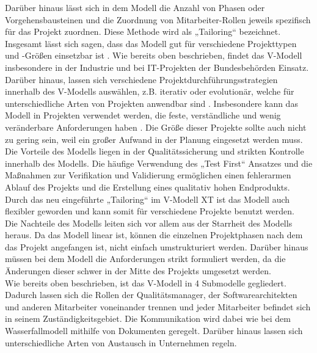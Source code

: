 Darüber hinaus lässt sich in dem Modell die Anzahl von Phasen oder Vorgehensbausteinen und die Zuordnung von Mitarbeiter-Rollen jeweils spezifisch für das Projekt zuordnen. Diese Methode wird als „Tailoring“ 
bezeichnet. \cite[6]{Frie:2009:V:}
\\
Insgesamt lässt sich sagen, dass das Modell gut für verschiedene Projekttypen und -Größen einsetzbar ist \cite[3]{Frie:2009:V:}. 
Wie bereits oben beschrieben, findet das V-Modell insbesondere in der Industrie und bei IT-Projekten der Bundesbehörden Einsatz. 
Darüber hinaus, lassen sich verschiedene Projektdurchführungsstrategien innerhalb des V-Modells auswählen, z.B. iterativ oder evolutionär, welche für unterschiedliche Arten von Projekten anwendbar sind \cite[7]{Hohn:2008:V:}. 
Insbesondere kann das Modell in Projekten verwendet werden, die feste, verständliche und wenig veränderbare Anforderungen haben \cite{Vans:2014:Software:}. Die Größe dieser Projekte sollte auch nicht zu gering sein, weil ein großer Aufwand in der Planung eingesetzt werden muss.
\\
Die Vorteile des Modells liegen in der Qualitätssicherung und strikten Kontrolle innerhalb des Modells. 
Die häufige Verwendung des „Test First“ Ansatzes und die Maßnahmen zur Verifikation und Validierung ermöglichen einen fehlerarmen Ablauf des Projekts und die Erstellung eines qualitativ hohen Endprodukts. 
Durch das neu eingeführte „Tailoring“ im V-Modell XT ist das Modell auch flexibler geworden und kann somit für verschiedene Projekte benutzt werden. 
\\Die Nachteile des Modells leiten sich vor allem aus der Starrheit des Modells heraus. Da das Modell linear ist, können die einzelnen Projektphasen nach dem das Projekt angefangen ist, nicht einfach umstrukturiert werden. 
Darüber hinaus müssen bei dem Modell die Anforderungen strikt formuliert werden, da die Änderungen dieser schwer in der Mitte des Projekts umgesetzt werden. \cite{TryQa:24102022:What:2} \cite{Buns:2008:Vorgehensmodelle:}
\\Wie bereits oben beschrieben, ist das V-Modell in 4 Submodelle gegliedert. Dadurch lassen sich die Rollen der Qualitätsmanager, der Softwarearchitekten und anderen Mitarbeiter voneinander trennen und 
jeder Mitarbeiter befindet sich in seinem Zuständigkeitsgebiet. Die Kommunikation wird dabei wie bei dem Wasserfallmodell mithilfe von Dokumenten geregelt. Darüber hinaus lassen sich unterschiedliche Arten von Austausch
in Unternehmen regeln. 